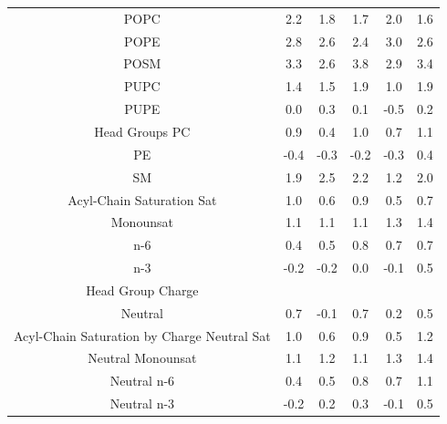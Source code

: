 \documentclass[12pt]{ruthesis_nofloat}
\begin{document}
\begin{table}
{\begin{tabular}{| c || ccccc |}
POPC    &2.2&1.8&1.7&2.0&1.6\\
POPE    &2.8&2.6&2.4&3.0&2.6\\
POSM    &3.3&2.6&3.8&2.9&3.4\\
PUPC    &1.4&1.5&1.9&1.0&1.9\\
PUPE    &0.0&0.3&0.1&-0.5&0.2\\
\hline
Head Groups 
PC      &0.9&0.4&1.0&0.7&1.1\\
PE      &-0.4&-0.3&-0.2&-0.3&0.4\\
SM      &1.9&2.5&2.2&1.2&2.0\\
\hline
Acyl-Chain Saturation 
Sat      &1.0&0.6&0.9&0.5&0.7\\
Monounsat      &1.1&1.1&1.1&1.3&1.4\\
n-6&0.4&0.5&0.8&0.7&0.7\\
n-3&-0.2&-0.2&0.0&-0.1&0.5\\
\hline
Head Group Charge&&&&&\\
Neutral &0.7&-0.1&0.7&0.2&0.5\\
\hline
Acyl-Chain Saturation by Charge 
Neutral Sat    &1.0&0.6&0.9&0.5&1.2\\
Neutral Monounsat    &1.1&1.2&1.1&1.3&1.4\\
Neutral n-6&0.4&0.5&0.8&0.7&1.1\\
Neutral n-3&-0.2&0.2&0.3&-0.1&0.5\\
\hline
\end{tabular}}
\end{table}
\end{document}
